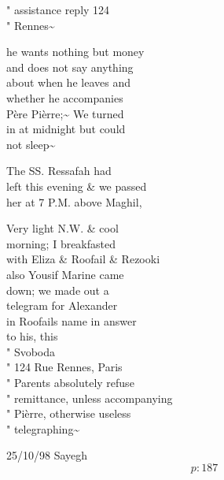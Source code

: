 \documentclass{report}
\begin{document}
	\par{
 	" assistance reply 124\ \\" Rennes\~{}\ \\
	}

	\par{
 	he wants nothing but money\ \\and does not say anything\ \\about when he leaves and\ \\whether he accompanies\ \\Père Pièrre;\~{} We turned\ \\in at midnight but could\ \\not sleep\~{}\ \\
	}

	\par{
 	The SS. Ressafah had\ \\left this evening \& we passed\ \\her at 7 P.M. above Maghil,\ \\
	}

	\par{
 	Very light N.W. \& cool\ \\morning; I breakfasted\ \\with Eliza \& Roofail \& Rezooki\ \\also Yousif Marine came\ \\down; we made out a\ \\telegram for Alexander\ \\in Roofails name in answer\ \\to his, this\ \\" Svoboda\ \\" 124 Rue Rennes, Paris\ \\" Parents absolutely refuse\ \\" remittance, unless accompanying\ \\" Pièrre, otherwise useless\ \\" telegraphing\~{}\ \\
	}

	\par{
 	25/10/98 Sayegh\ \\
  \[p: 187 \]

	}

\end{document}
